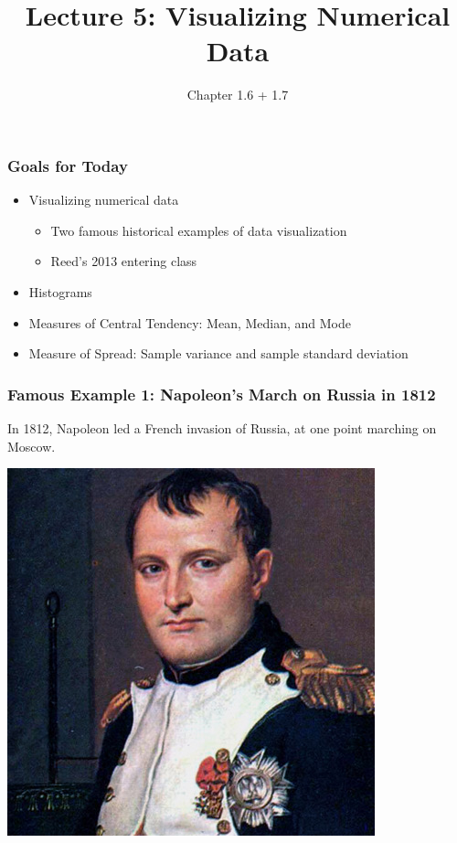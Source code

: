 \documentclass[handout]{beamer}
\title{Lecture 5: Visualizing Numerical Data}
\author{Chapter 1.6 + 1.7}
\date{}
\begin{document}
\begin{frame}
\titlepage
\end{frame}



\begin{frame}
\frametitle{Goals for Today}

\begin{itemize}
\item Visualizing numerical data
\begin{itemize}
\item Two famous historical examples of data visualization
\item Reed's 2013 entering class
\end{itemize}
\item Histograms
\item Measures of Central Tendency: Mean, Median, and Mode
\item Measure of Spread:  Sample variance and sample standard deviation
\end{itemize}

\end{frame}


\begin{frame}
\frametitle{Famous Example 1:  Napoleon's March on Russia in 1812}

In 1812, Napoleon led a French invasion of Russia, at one point marching on Moscow.  
\begin{center}
\includegraphics[height=0.6\textheight]{figure/napoleon.jpg}
\end{center}

\end{frame}
\end{document}
